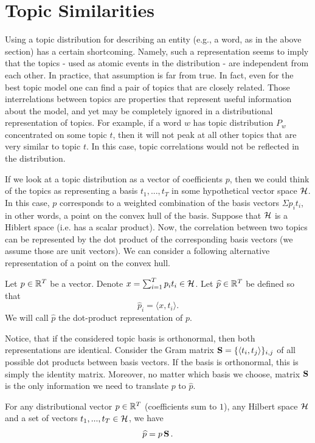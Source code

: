 \documentclass{article} %
\begin{document}
\section{Topic Similarities}
\label{sec:topic-similarities}
Using a topic distribution for describing an entity (e.g., a word, as in
the above section) has a certain
shortcoming. Namely, such a representation seems to imply that the
topics - used as atomic events in the distribution - are independent
from each other. In practice, that assumption is far from true. In
fact, even for the best topic model one can find a pair of topics that
are closely related. Those interrelations between topics are
properties that represent useful information about the model, and yet
may be completely ignored in a distributional representation of
topics. For example, if a word $w$ has topic distribution $P_w$
concentrated on some topic $t$, then it will 
not peak at all other topics that are very similar to
topic $t$. In this case, topic correlations would not be reflected in
the distribution. 

If we look at a topic distribution as a vector of coefficients $p$, then
we could think of the topics as representing a basis $t_1,...,t_T$ in
some hypothetical vector space ${\mathcal H}$. In 
this case, $p$ corresponds to a weighted combination of the basis
vectors $\Sigma p_i t_i$, in other words, a point on the convex hull of the basis.
Suppose that ${\mathcal H}$ is a Hiblert space (i.e. has a scalar
product). Now, the correlation between two topics can be represented
by the dot product of the corresponding basis vectors (we assume those
are unit vectors). We can consider a following alternative representation
of a point on the convex hull.

\bed
Let $p\in{\mathbb R}^T$ be a vector. Denote $x=\sum_{i=1}^T p_i
t_i\in{\mathcal H}$. Let $\widehat{p}\in{\mathbb R}^T$ be defined so that
\[\widehat{p}_i = \langle x,t_i\rangle.\]
We will call $\widehat{p}$ the dot-product representation of $p$.
\eed

Notice, that if the considered topic basis is orthonormal, then both
representations are identical. Consider the Gram matrix
$\operatorname{\mathbf{S}}=\{\langle t_i,t_j\rangle\}_{i,j}$ of all possible dot products between
basis vectors. If the basis is orthonormal, this is simply the identity
matrix. Moreover, no matter which basis we choose, matrix $\operatorname{\mathbf{S}}$ is the
only information we need to translate $p$ to $\widehat{p}$.

\ber
For any distributional vector $p\in{\mathbb R}^T$ (coefficients
sum to $1$), any Hilbert space ${\mathcal H}$ and a set of
vectors $t_1,...,t_T\in{\mathcal H}$, we have 
\[\widehat{p} = p\operatorname{\mathbf{S}}.\]
\eer
\end{document}
